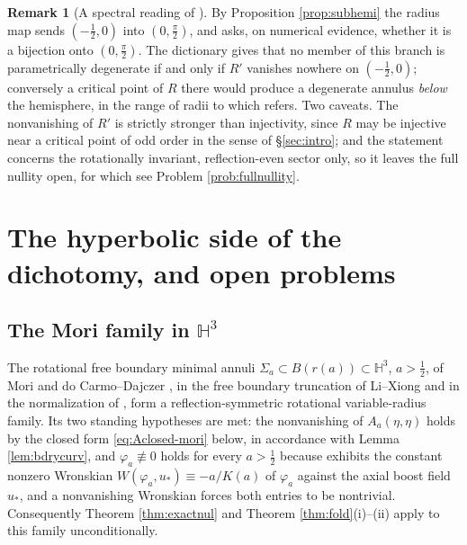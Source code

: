 \documentclass[11pt,a4paper]{amsart}
\theoremstyle{plain}
\theoremstyle{definition}
\newtheorem{remark}[theorem]{Remark}
\newcommand{\Hyp}{\mathbb{H}}
\begin{document}
\begin{remark}[A spectral reading of {\cite[Rem. 3.5]{dO24}}]\label{rem:dO35}
By Proposition \ref{prop:subhemi} the radius map sends $(-\tfrac12,0)$ into $(0,\tfrac\pi2)$, and \cite[Rem. 3.5]{dO24} asks, on numerical evidence, whether it is a bijection onto $(0,\tfrac\pi2)$. The dictionary gives that no member of this branch is parametrically degenerate if and only if $R'$ vanishes nowhere on $(-\tfrac12,0)$; conversely a critical point of $R$ there would produce a degenerate annulus \emph{below} the hemisphere, in the range of radii
to which \cite[Q. 6.6]{NZ1} refers. Two caveats. The nonvanishing of $R'$ is strictly stronger than injectivity, since $R$ may be injective near a critical point of odd order in the sense of \S\ref{sec:intro}; and the statement concerns the rotationally invariant, reflection-even sector only, so it leaves the full nullity open, for which see Problem \ref{prob:fullnullity}.
\end{remark}

\section{The hyperbolic side of the dichotomy, and open problems}\label{sec:remarks}

\subsection*{The Mori family in \texorpdfstring{$\Hyp^3$}{H3}}

The rotational free boundary minimal annuli $\Sigma_a\subset B(r(a))\subset\Hyp^3$, $a>\tfrac12$, of Mori \cite{Mori81} and do Carmo--Dajczer \cite{dCD83}, in the free boundary truncation of Li--Xiong \cite[\S 2]{LX18} and in the normalization of \cite{P1,P2}, form a reflection-symmetric rotational variable-radius family. Its two standing hypotheses are met: the nonvanishing of $A_a(\eta,\eta)$ holds by the closed form \eqref{eq:Aclosed-mori} below, in accordance with Lemma \ref{lem:bdrycurv}, and $\varphi_a\not\equiv 0$ holds for every $a>\tfrac12$ because \cite[Lem. 11.1]{P1} exhibits the constant nonzero Wronskian $W(\varphi_a,u_*)\equiv-a/K(a)$ of $\varphi_a$ against the axial boost field $u_*$, and a nonvanishing Wronskian forces both entries to be nontrivial. Consequently Theorem \ref{thm:exactnul} and Theorem \ref{thm:fold}(i)--(ii) apply to this family unconditionally.
\end{document}
